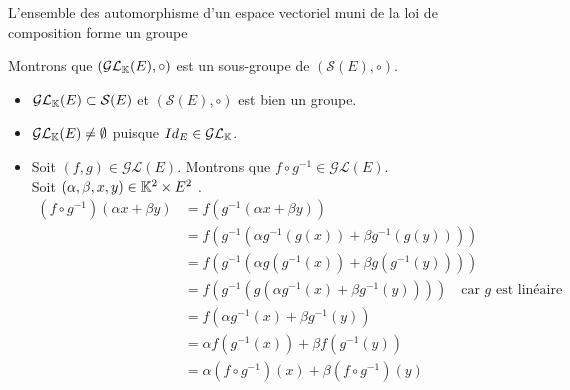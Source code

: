 \documentclass{article}
\renewenvironment{question_kholle}[2][ ]
{
	\subsection{\texorpdfstring{#2}{}}
	\notblank{#1}
	{
		\noindent #1
		\bigbreak
	}
	{}
	\begin{proof}
}
{
	\end{proof}
}
\begin{document}
\begin{question_kholle}
	{L'ensemble des automorphisme d'un espace vectoriel muni de la loi de composition forme un groupe}

	Montrons que $(\mathcal{GL}_{\mathbb K}(E), \circ)$ est un sous-groupe de $(\mathcal{S}(E), \circ)$.
	\begin{itemize}
		\item $\mathcal{GL}_{\mathbb K}(E) \subset \mathcal{S}(E)$ et $(\mathcal{S}(E), \circ)$ est bien un groupe.
		\item $\mathcal{GL}_{\mathbb K}(E) \neq \emptyset$ puisque $Id_E \in \mathcal{GL}_{\mathbb K}$.
		\item Soit $(f, g) \in \mathcal{GL}(E)$. Montrons que $f \circ g^{-1} \in \mathcal{GL}(E)$. \\
		      Soit $(\alpha, \beta, x, y) \in \mathbb K^2 \times E^2$ \fqs. \\
		      \begin{equation*}
			      \begin{aligned}
				      \left(f \circ g^{-1}\right) \left(\alpha x + \beta y\right)
				       & = f \left( g^{-1} \left(\alpha x + \beta y\right) \right)                                                                             \\
				       & = f \left( g^{-1} \left(\alpha g^{-1}(g(x)) + \beta g^{-1}(g(y))\right) \right)                                                       \\
				       & = f \left( g^{-1} \left( \alpha g\left(g^{-1}(x)\right) + \beta g\left(g^{-1}(y)\right) \right) \right)                               \\
				       & = f \left( g^{-1} \left( g \left( \alpha g^{-1}(x) + \beta g^{-1}(y) \right) \right) \right) \quad \text{car } g \text{ est linéaire} \\
				       & = f \left( \alpha g^{-1}(x) + \beta g^{-1}(y) \right)                                                                                 \\
				       & = \alpha f \left( g^{-1}(x) \right) + \beta f \left( g^{-1}(y) \right)                                                                \\
				       & = \alpha \left(f \circ g^{-1}\right) (x) + \beta \left(f \circ g^{-1}\right) (y)
			      \end{aligned}
		      \end{equation*}
	\end{itemize}
\end{question_kholle}
\end{document}

